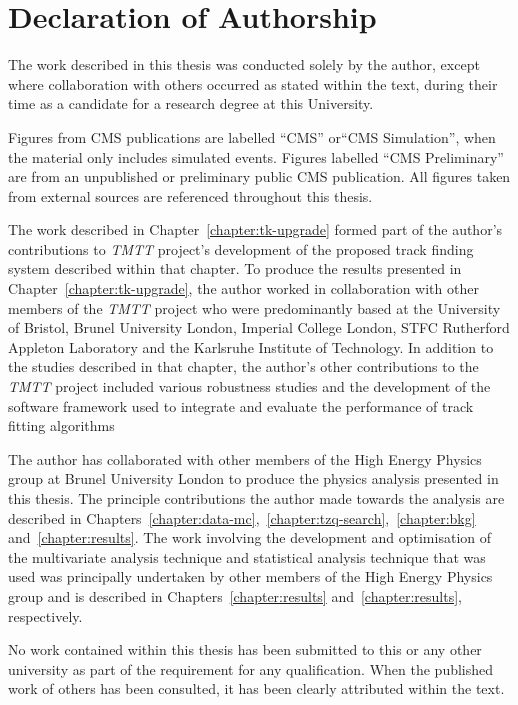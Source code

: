 \documentclass[11pt,a4paper]{report}
\begin{document}
\chapter*{Declaration of Authorship} \label{sec:declaration}
The work described in this thesis was conducted solely by the author, except where collaboration with others occurred as stated within the text, during their time as a candidate for a research degree at this University.

Figures from CMS publications are labelled ``CMS'' or``CMS Simulation'', when the material only includes simulated events.
Figures labelled ``CMS Preliminary'' are from an unpublished or preliminary public CMS publication.
All figures taken from external sources are referenced throughout this thesis.

The work described in Chapter~\ref{chapter:tk-upgrade} formed part of the author's contributions to \emph{TMTT} project's development of the proposed track finding system described within that chapter.
To produce the results presented in Chapter~\ref{chapter:tk-upgrade}, the author worked in collaboration with other members of the \emph{TMTT} project who were predominantly based at the University of Bristol, Brunel University London, Imperial College London, STFC Rutherford Appleton Laboratory and the Karlsruhe Institute of Technology.
In addition to the studies described in that chapter, the author's other contributions to the \emph{TMTT} project included various robustness studies and the development of the software framework used to integrate and evaluate the performance of track fitting algorithms

The author has collaborated with other members of the High Energy Physics group at Brunel University London to produce the physics analysis presented in this thesis.
The principle contributions the author made towards the analysis are described in Chapters~\ref{chapter:data-mc},~\ref{chapter:tzq-search},~\ref{chapter:bkg} and~\ref{chapter:results}.
The work involving the development and optimisation of the multivariate analysis technique and statistical analysis technique that was used was principally undertaken by other members of the High Energy Physics group and is described in Chapters~\ref{chapter:results} and~\ref{chapter:results}, respectively.


No work contained within this thesis has been submitted to this or any other university as part of the requirement for any qualification.
When the published work of others has been consulted, it has been clearly attributed within the text.
\end{document}

